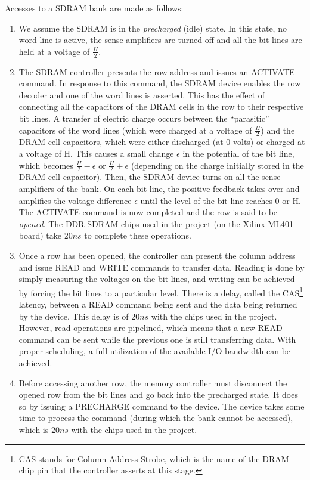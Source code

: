 \documentclass[a4paper,11pt]{kthesis}
\begin{document}
Accesses to a SDRAM bank are made as follows:
\begin{enumerate}
\item We assume the SDRAM is in the \textit{precharged} (idle) state. In this state, no word line is active, the sense amplifiers are turned off and all the bit lines are held at a voltage of $\frac{H}{2}$.
\item The SDRAM controller presents the row address and issues an ACTIVATE command. In response to this command, the SDRAM device enables the row decoder and one of the word lines is asserted. This has the effect of connecting all the capacitors of the DRAM cells in the row to their respective bit lines. A transfer of electric charge occurs between the ``parasitic'' capacitors of the word lines (which were charged at a voltage of $\frac{H}{2}$) and the DRAM cell capacitors, which were either discharged (at 0 volts) or charged at a voltage of H. This causes a small change $\epsilon$ in the potential of the bit line, which becomes $\frac{H}{2}-\epsilon$ or $\frac{H}{2}+\epsilon$ (depending on the charge initially stored in the DRAM cell capacitor). Then, the SDRAM device turns on all the sense amplifiers of the bank. On each bit line, the positive feedback takes over and amplifies the voltage difference $\epsilon$ until the level of the bit line reaches 0 or H. The ACTIVATE command is now completed and the row is said to be \textit{opened}. The DDR SDRAM chips used in the project (on the Xilinx ML401 board) take $20\unit{ns}$ to complete these operations.
\item Once a row has been opened, the controller can present the column address and issue READ and WRITE commands to transfer data. Reading is done by simply measuring the voltages on the bit lines, and writing can be achieved by forcing the bit lines to a particular level. There is a delay, called the CAS\footnote{CAS stands for Column Address Strobe, which is the name of the DRAM chip pin that the controller asserts at this stage.} latency, between a READ command being sent and the data being returned by the device. This delay is of $20\unit{ns}$ with the chips used in the project. However, read operations are pipelined, which means that a new READ command can be sent while the previous one is still transferring data. With proper scheduling, a full utilization of the available I/O bandwidth can be achieved.
\item Before accessing another row, the memory controller must disconnect the opened row from the bit lines and go back into the precharged state. It does so by issuing a PRECHARGE command to the device. The device takes some time to process the command (during which the bank cannot be accessed), which is $20\unit{ns}$ with the chips used in the project.
\end{enumerate}
\end{document}
